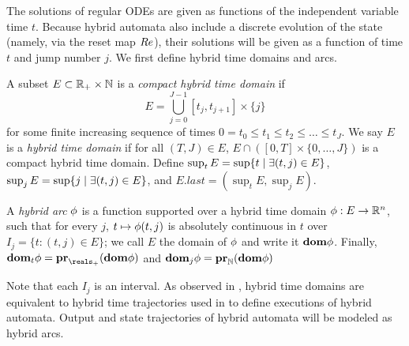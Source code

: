 The solutions of regular ODEs are given as functions of the independent variable time $t$.
Because hybrid automata also include a discrete evolution of the state (namely, via the reset map $Re$), their solutions will be given as a function of time $t$ and jump number $j$.
We first define hybrid time domains and arcs.
\begin{defn}
	\label{def:hybridarcs}
	A subset $E \subset \mathbb{R}_+\times \mathbb{N}$ is a \emph{compact hybrid time domain} if 
	\[E = \bigcup_{j=0}^{J-1}[t_j,t_{j+1}]\times \{j\}\]
	for some finite increasing sequence of times $0=t_0 \leq t_1 \leq t_2 \leq \ldots \leq t_J$.
	We say $E$ is a \emph{hybrid time domain} if for all $(T,J) \in E$, 
	$E \cap ([0,T]\times \{0,\ldots,J\})$ is a compact hybrid time domain.
	Define
	$\sup_t E = \sup \{t \;|\; \exists (t,j) \in E\}$, $\sup_j E = \sup \{j \;|\; \exists (t,j) \in E\}$,
	and $E.last = (\sup_t E, \sup_j E)$.
	
	A \emph{hybrid arc} $\mathbf{\phi}$ is a function supported over a hybrid time domain $\mathbf{\phi}:E \rightarrow \mathbb{R}^n$, 
	such that for every $j$, $t \mapsto \mathbf{\phi}(t,j)$ is absolutely continuous in $t$ over $I_j = \{t: (t,j) \in E\}$;
	we call $E$ the domain of $\mathbf{\phi}$ and write it $\mathbf{dom} \mathbf{\phi}$.
	Finally, $\dom_t \hstraj = \proj{\dom \hstraj}{\nnreals}$ and $\mathbf{dom}_j \mathbf{\phi} = {\bf pr}_{\mathbb{N}}(\mathbf{dom} \mathbf{\phi})$
\end{defn}

Note that each $I_j$ is an interval.
As observed in \cite{SanfeliceT10automatica}, hybrid time domains are equivalent to hybrid time trajectories used in \cite{LygerosJSZS03tac} to define executions of hybrid automata.
Output and state trajectories of hybrid automata will be modeled as hybrid arcs. 

